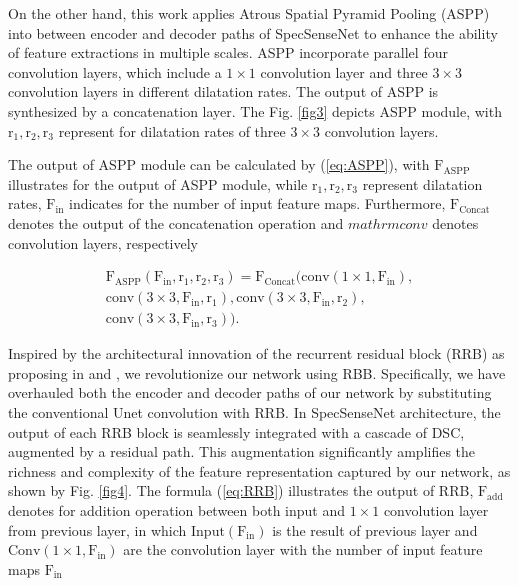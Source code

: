 \documentclass[journal]{IEEEtran} %
\begin{document}
On the other hand, this work applies Atrous Spatial Pyramid Pooling (ASPP) \cite{ChenAtrous} into between encoder and decoder paths of SpecSenseNet to enhance the ability of feature extractions in multiple scales. ASPP incorporate parallel four convolution layers, which include a $\mathrm{1\times1}$ convolution layer and three $\mathrm{3\times3}$ convolution layers in different dilatation rates. The output of ASPP is synthesized by a concatenation layer. The Fig. \ref{fig3} depicts ASPP module, with $\mathrm{r_1, r_2, r_3}$ represent for dilatation rates of three $\mathrm{3\times3}$ convolution layers. 


The output of ASPP module can be calculated by (\ref{eq:ASPP}), with $\mathrm{F_{\text{ASPP}}}$ illustrates for the output of ASPP module, while $\mathrm{r_1, r_2, r_3}$ represent dilatation rates, $\mathrm{F_{in}}$ indicates for the number of input feature maps. Furthermore, $\mathrm{F_{\text{Concat}}}$ denotes the output of the concatenation operation and $mathrm{conv}$ denotes convolution layers, respectively

\begin{equation}
\begin{aligned}
    \mathrm{F_{\text{ASPP}}(F_{in},r_1,r_2,r_3) = F_{\text{Concat}}( conv(1\times1,F_{in}),} \\ \mathrm{conv(3\times3,F_{in},r_1)},\mathrm{conv(3 \times 3,F_{in},r_2)}, \\ \mathrm{conv(3\times3,F_{in},r_3))}.
    \label{eq:ASPP}
\end{aligned}
\end{equation}


Inspired by the architectural innovation of the recurrent residual block (RRB) as proposing in \cite{aghalari2021brain} and \cite{he2016deep}, we revolutionize our network using RBB. Specifically, we have overhauled both the encoder and decoder paths of our network by substituting the conventional Unet convolution with RRB. In SpecSenseNet architecture, the output of each RRB block is seamlessly integrated with a cascade of DSC, augmented by a residual path. This augmentation significantly amplifies the richness and complexity of the feature representation captured by our network, as shown by Fig. \ref{fig4}. The formula (\ref{eq:RRB}) illustrates the output of RRB, $\mathrm{F_{\text{add}}}$ denotes for addition operation between both input and $\mathrm{1\times1}$ convolution layer from previous layer, in which $\mathrm{Input(F_{in})}$ is the result of previous layer and $\mathrm{Conv(1\times1,F_{in})}$ are the convolution layer with the number of input feature maps $\mathrm{F_{in}}$
\end{document}
